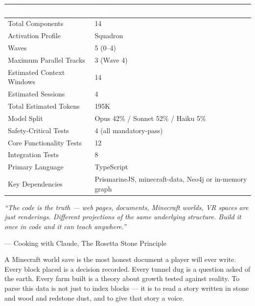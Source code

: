 \documentclass[11pt,letterpaper]{article}
\newcommand{\tableheader}[1]{\textbf{\sffamily\textcolor{white}{#1}}}
\begin{document}
\begin{center}
\begin{tabularx}{\textwidth}{L{5cm}X}
\toprule
{}
\tableheader{Metric} & \tableheader{Value} \\
\midrule
Total Components & 14 \\
Activation Profile & Squadron \\
Waves & 5 (0--4) \\
Maximum Parallel Tracks & 3 (Wave 4) \\
Estimated Context Windows & 14 \\
Estimated Sessions & 4 \\
Total Estimated Tokens & 195K \\
Model Split & Opus 42\% / Sonnet 52\% / Haiku 5\% \\
Safety-Critical Tests & 4 (all mandatory-pass) \\
Core Functionality Tests & 12 \\
Integration Tests & 8 \\
Primary Language & TypeScript \\
Key Dependencies & PrismarineJS, minecraft-data, Neo4j or in-memory graph \\
\bottomrule
\end{tabularx}
\end{center}

\vspace{1cm}

\begin{quotebox}
\textit{``The code is the truth --- web pages, documents, Minecraft worlds, VR spaces are just renderings. Different projections of the same underlying structure. Build it once in code and it can teach anywhere.''}

\vspace{0.5em}
\hfill --- Cooking with Claude, The Rosetta Stone Principle

\vspace{0.5em}
A Minecraft world save is the most honest document a player will ever write. Every block placed is a decision recorded. Every tunnel dug is a question asked of the earth. Every farm built is a theory about growth tested against reality. To parse this data is not just to index blocks --- it is to read a story written in stone and wood and redstone dust, and to give that story a voice.
\end{quotebox}
\end{document}
